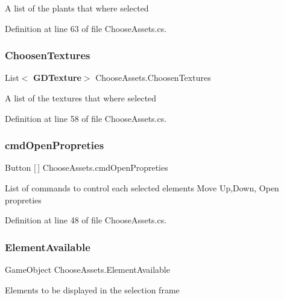 A list of the plants that where selected 



Definition at line 63 of file Choose\+Assets.\+cs.

\mbox{\label{class_choose_assets_a16f6012ea7261f6ddb2be3244d494516}} 
\subsubsection{Choosen\+Textures}
{\footnotesize\ttfamily List$<$\textbf{ G\+D\+Texture}$>$ Choose\+Assets.\+Choosen\+Textures}



A list of the textures that where selected 



Definition at line 58 of file Choose\+Assets.\+cs.

\mbox{\label{class_choose_assets_aeefcb389af6f12ba925c4becf5d1d06d}} 
\subsubsection{cmd\+Open\+Propreties}
{\footnotesize\ttfamily Button [$\,$] Choose\+Assets.\+cmd\+Open\+Propreties}



List of commands to control each selected elements Move Up,Down, Open propreties 



Definition at line 48 of file Choose\+Assets.\+cs.

\mbox{\label{class_choose_assets_a7f25d91291f73930cc5e57854338d1c9}} 
\subsubsection{Element\+Available}
{\footnotesize\ttfamily Game\+Object Choose\+Assets.\+Element\+Available}



Elements to be displayed in the selection frame 



